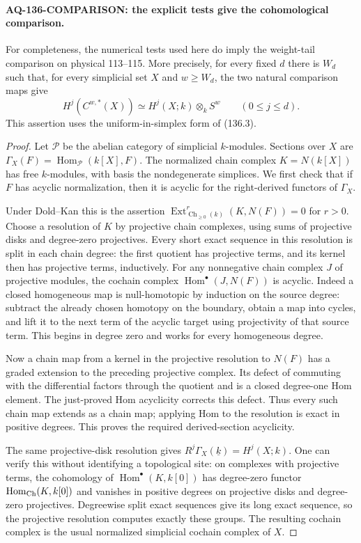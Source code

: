 \paragraph{AQ-136-COMPARISON: the explicit tests give the cohomological comparison.}
For completeness, the numerical tests used here do imply the
weight-tail comparison on physical 113--115.  More precisely,
for every fixed $d$ there is $W_d$ such that, for every simplicial
set $X$ and $w\geq W_d$, the two natural comparison maps give
\[
 H^j(C^{w,*}(X))\simeq H^j(X;k)\otimes_k S^w
                  \qquad(0\leq j\leq d).                  \tag{136.2}
\]
This assertion uses the uniform-in-simplex form of (136.3).

\begin{proof}
Let $\mathcal P$ be the abelian category of simplicial
$k$-modules.  Sections over $X$ are
$\Gamma_X(F)=\operatorname{Hom}_{\mathcal P}(k[X],F)$.
The normalized chain complex $K=N(k[X])$ has free $k$-modules,
with basis the nondegenerate simplices.  We first check that
if $F$ has acyclic normalization, then it is acyclic for the
right-derived functors of $\Gamma_X$.

Under Dold--Kan this is the assertion
$\operatorname{Ext}^r_{\operatorname{Ch}_{\geq0}(k)}
 (K,N(F))=0$ for $r>0$.
Choose a resolution of $K$ by projective chain complexes,
using sums of projective disks and degree-zero projectives.
Every short exact sequence in this resolution is split in
each chain degree: the first quotient has projective terms,
and its kernel then has projective terms, inductively.
For any nonnegative chain complex $J$ of projective modules,
the cochain complex $\operatorname{Hom}^{\bullet}(J,N(F))$
is acyclic.  Indeed a closed homogeneous map is
null-homotopic by induction on the source degree: subtract
the already chosen homotopy on the boundary, obtain a map
into cycles, and lift it to the next term of the acyclic
target using projectivity of that source term.  This begins
in degree zero and works for every homogeneous degree.

Now a chain map from a kernel in the projective resolution
to $N(F)$ has a graded extension to the preceding projective
complex.  Its defect of commuting with the differential
factors through the quotient and is a closed degree-one
Hom element.  The just-proved Hom acyclicity corrects this
defect.  Thus every such chain map extends as a chain map;
applying Hom to the resolution is exact in positive degrees.
This proves the required derived-section acyclicity.

The same projective-disk resolution gives
$R^j\Gamma_X(\underline{k})=H^j(X;k)$.
One can verify this without identifying a topological site:
on complexes with projective terms, the cohomology of
$\operatorname{Hom}^{\bullet}(K,k[0])$ has degree-zero
functor $\operatorname{Hom}_{\rm Ch}(K,k[0])$ and vanishes
in positive degrees on projective disks and degree-zero
projectives.  Degreewise split exact sequences give its
long exact sequence, so the projective resolution computes
exactly these groups.  The resulting cochain complex is
the usual normalized simplicial cochain complex of $X$.


\end{proof}
